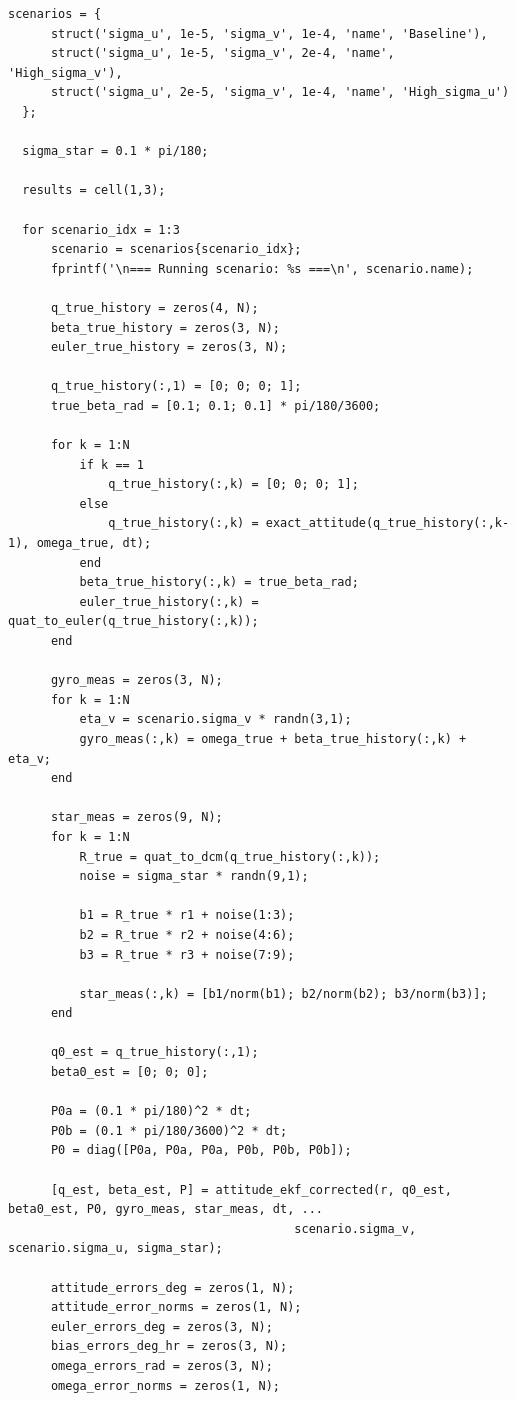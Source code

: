 \documentclass[12pt,A4, onecolumn]{exam}
\begin{document}
\begin{questions}
\begin{lstlisting}[style=matlabstyle]
  scenarios = {
      struct('sigma_u', 1e-5, 'sigma_v', 1e-4, 'name', 'Baseline'),
      struct('sigma_u', 1e-5, 'sigma_v', 2e-4, 'name', 'High_sigma_v'), 
      struct('sigma_u', 2e-5, 'sigma_v', 1e-4, 'name', 'High_sigma_u')
  };

  sigma_star = 0.1 * pi/180;

  results = cell(1,3);

  for scenario_idx = 1:3 
      scenario = scenarios{scenario_idx};
      fprintf('\n=== Running scenario: %s ===\n', scenario.name);
      
      q_true_history = zeros(4, N);
      beta_true_history = zeros(3, N);
      euler_true_history = zeros(3, N);
      
      q_true_history(:,1) = [0; 0; 0; 1];
      true_beta_rad = [0.1; 0.1; 0.1] * pi/180/3600; 
      
      for k = 1:N
          if k == 1
              q_true_history(:,k) = [0; 0; 0; 1];
          else
              q_true_history(:,k) = exact_attitude(q_true_history(:,k-1), omega_true, dt);
          end
          beta_true_history(:,k) = true_beta_rad;
          euler_true_history(:,k) = quat_to_euler(q_true_history(:,k));
      end
      
      gyro_meas = zeros(3, N);
      for k = 1:N
          eta_v = scenario.sigma_v * randn(3,1);
          gyro_meas(:,k) = omega_true + beta_true_history(:,k) + eta_v;
      end
      
      star_meas = zeros(9, N);
      for k = 1:N
          R_true = quat_to_dcm(q_true_history(:,k));
          noise = sigma_star * randn(9,1);
          
          b1 = R_true * r1 + noise(1:3);
          b2 = R_true * r2 + noise(4:6);
          b3 = R_true * r3 + noise(7:9);
          
          star_meas(:,k) = [b1/norm(b1); b2/norm(b2); b3/norm(b3)];
      end
      
      q0_est = q_true_history(:,1); 
      beta0_est = [0; 0; 0];

      P0a = (0.1 * pi/180)^2 * dt; 
      P0b = (0.1 * pi/180/3600)^2 * dt;   
      P0 = diag([P0a, P0a, P0a, P0b, P0b, P0b]);
      
      [q_est, beta_est, P] = attitude_ekf_corrected(r, q0_est, beta0_est, P0, gyro_meas, star_meas, dt, ...
                                        scenario.sigma_v, scenario.sigma_u, sigma_star);
      
      attitude_errors_deg = zeros(1, N);
      attitude_error_norms = zeros(1, N);
      euler_errors_deg = zeros(3, N);
      bias_errors_deg_hr = zeros(3, N);
      omega_errors_rad = zeros(3, N);
      omega_error_norms = zeros(1, N);
      

\end{lstlisting}
\end{questions}
\end{document}
